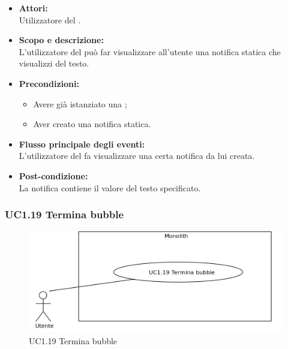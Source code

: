 \begin{itemize}
	\item \textbf{Attori:}
	\\Utilizzatore del .
	\item \textbf{Scopo e descrizione:} 
	\\L’utilizzatore del  può far visualizzare all’utente una notifica statica che visualizzi del testo.
	\item \textbf{Precondizioni:}
	\begin{itemize}
		\item Avere già istanziato una ;
		\item Aver creato una notifica statica.
	\end{itemize}
	\item \textbf{Flusso principale degli eventi:}
	\\L’utilizzatore del  fa visualizzare una certa notifica da lui creata.
	\item \textbf{Post-condizione:}
	\\La notifica contiene il valore del testo specificato.
\end{itemize}

\subsubsection{UC1.19 Termina bubble} \label{UC1.19}

\begin{figure}[H]
	\centering
	\includegraphics[width=15cm]{../../documenti/AnalisiDeiRequisiti/Diagrammi_img/uc1_19.png}
	\caption{UC1.19 Termina bubble}
\end{figure}

